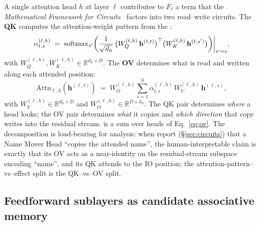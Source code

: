 A single attention head $h$ at layer $\ell$ contributes to $F_\ell$ a
term that the \emph{Mathematical Framework for 
Circuits}~ factors into two
read--write circuits. The \textbf{QK } computes the
attention-weight pattern from the :
\begin{equation}
  \alpha^{(\ell, h)}_{t, s}
  \;=\;
  \operatorname{softmax}_{s'}\!\left(\frac{1}{\sqrt{d_h}}\,
    \big(W_Q^{(\ell, h)}\,\mathbf{h}^{(\ell, t)}\big)^\top
    \big(W_K^{(\ell, h)}\,\mathbf{h}^{(\ell, s')}\big)
  \right)\!\bigg|_{s' = s},
  \label{eq:qk}
\end{equation}
with $W_Q^{(\ell, h)}, W_K^{(\ell, h)} \in \mathbb{R}^{d_h \times D}$.
The \textbf{OV } determines what is read and written along
each attended position:
\begin{equation}
  \mathrm{Attn}_{\ell, h}\!\left(\mathbf{h}^{(\ell, t)}\right)
  \;=\;
  W_O^{(\ell, h)}\sum_{s = 1}^{S}
    \alpha^{(\ell, h)}_{t, s}\,
    W_V^{(\ell, h)}\,\mathbf{h}^{(\ell, s)},
  \label{eq:ov}
\end{equation}
with $W_V^{(\ell, h)} \in \mathbb{R}^{d_h \times D}$ and
$W_O^{(\ell, h)} \in \mathbb{R}^{D \times d_h}$. The QK pair determines
\emph{where} a head looks; the OV pair determines \emph{what} it
copies and \emph{which direction} that copy writes into the residual
stream.  is a sum over heads of
Eq.~\eqref{eq:ov}. The decomposition is load-bearing for 
analysis: when \citet{wang2022-ioi} report (\S\ref{sec:circuits})
that a Name Mover Head ``copies the attended name'', the
human-interpretable claim is exactly that its OV  acts as a
near-identity on the residual-stream subspace encoding ``name'', and
its QK  attends to the IO position; the
attention-pattern--vs--effect split is the QK--vs--OV split.

\subsection{Feedforward sublayers as candidate associative memory}
\label{sec:substrate-ffn}

